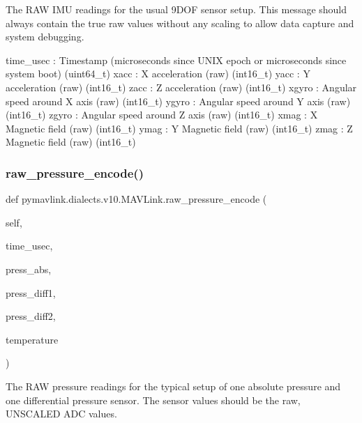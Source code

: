 \begin{DoxyVerb}
\begin{DoxyVerb}
\begin{DoxyVerb}
\begin{DoxyVerb}
\begin{DoxyVerb}The RAW IMU readings for the usual 9DOF sensor setup. This message
should always contain the true raw values without any
scaling to allow data capture and system debugging.

time_usec                 : Timestamp (microseconds since UNIX epoch or microseconds since system boot) (uint64_t)
xacc                      : X acceleration (raw) (int16_t)
yacc                      : Y acceleration (raw) (int16_t)
zacc                      : Z acceleration (raw) (int16_t)
xgyro                     : Angular speed around X axis (raw) (int16_t)
ygyro                     : Angular speed around Y axis (raw) (int16_t)
zgyro                     : Angular speed around Z axis (raw) (int16_t)
xmag                      : X Magnetic field (raw) (int16_t)
ymag                      : Y Magnetic field (raw) (int16_t)
zmag                      : Z Magnetic field (raw) (int16_t)\end{DoxyVerb}
 \mbox{\label{classpymavlink_1_1dialects_1_1v10_1_1MAVLink_a590f61162c2a9cadef5e7c0e38e5e6ad}} 
\subsubsection{\texorpdfstring{raw\+\_\+pressure\+\_\+encode()}{raw\_pressure\_encode()}}
{\footnotesize\ttfamily def pymavlink.\+dialects.\+v10.\+M\+A\+V\+Link.\+raw\+\_\+pressure\+\_\+encode (\begin{DoxyParamCaption}\item[{}]{self,  }\item[{}]{time\+\_\+usec,  }\item[{}]{press\+\_\+abs,  }\item[{}]{press\+\_\+diff1,  }\item[{}]{press\+\_\+diff2,  }\item[{}]{temperature }\end{DoxyParamCaption})}

\begin{DoxyVerb}The RAW pressure readings for the typical setup of one absolute
pressure and one differential pressure sensor. The
sensor values should be the raw, UNSCALED ADC values.


\end{DoxyVerb}
\end{DoxyVerb}
\end{DoxyVerb}
\end{DoxyVerb}
\end{DoxyVerb}
